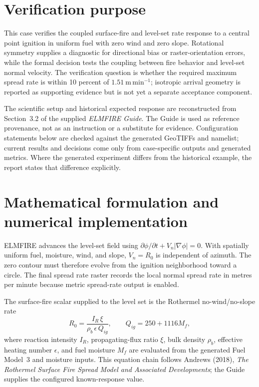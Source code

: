 \section{Verification purpose}

This case verifies the coupled surface-fire and level-set rate response to a central point ignition in uniform fuel with zero wind and zero slope. Rotational symmetry supplies a diagnostic for directional bias or raster-orientation errors, while the formal decision tests the coupling between fire behavior and level-set normal velocity. The verification question is whether the required maximum spread rate is within 10 percent of \(1.51~\mathrm{m\,min^{-1}}\); isotropic arrival geometry is reported as supporting evidence but is not yet a separate acceptance component.

The scientific setup and historical expected response are reconstructed from Section~3.2 of the supplied \emph{ELMFIRE Guide}. The Guide is used as reference provenance, not as an instruction or a substitute for evidence. Configuration statements below are checked against the generated GeoTIFFs and namelist; current results and decisions come only from case-specific outputs and generated metrics. Where the generated experiment differs from the historical example, the report states that difference explicitly.

\section{Mathematical formulation and numerical implementation}

ELMFIRE advances the level-set field using \(\partial\phi/\partial t+V_n|\nabla\phi|=0\).  With spatially uniform fuel, moisture, wind, and slope, \(V_n=R_0\) is independent of azimuth.  The zero contour must therefore evolve from the ignition neighborhood toward a circle.  The final spread rate raster records the local normal spread rate in metres per minute because metric spread-rate output is enabled.

The surface-fire scalar supplied to the level set is the Rothermel no-wind/no-slope rate
\begin{equation}
R_0=\frac{I_R\,\xi}{\rho_b\,\epsilon\,Q_{ig}}, \qquad Q_{ig}=250+1116M_f,
\end{equation}
where reaction intensity \(I_R\), propagating-flux ratio \(\xi\), bulk density \(\rho_b\), effective heating number \(\epsilon\), and fuel moisture \(M_f\) are evaluated from the generated Fuel Model~3 and moisture inputs. This equation chain follows Andrews (2018), \emph{The Rothermel Surface Fire Spread Model and Associated Developments}; the Guide supplies the configured known-response value.


